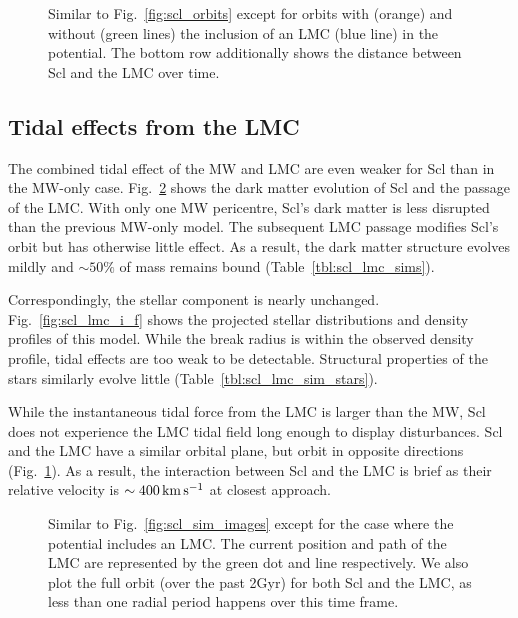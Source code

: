 \begin{figure}
\centering
{}
\caption[Sculptor orbits with LMC]{Similar to Fig.~\ref{fig:scl_orbits}
except for orbits with (orange) and without (green lines) the inclusion
of an LMC (blue line) in the potential. The bottom row additionally
shows the distance between Scl and the LMC over
time.}\label{fig:scl_lmc_orbits_effect}
\end{figure}

\subsection{Tidal effects from the
LMC}\label{tidal-effects-from-the-lmc}

The combined tidal effect of the MW and LMC are even weaker for Scl than
in the MW-only case. Fig.~\ref{fig:scl_lmc_sim_images} shows the dark
matter evolution of Scl and the passage of the LMC. With only one MW
pericentre, Scl's dark matter is less disrupted than the previous
MW-only model. The subsequent LMC passage modifies Scl's orbit but has
otherwise little effect. As a result, the dark matter structure evolves
mildly and \(\sim 50\%\) of mass remains bound
(Table~\ref{tbl:scl_lmc_sims}).

Correspondingly, the stellar component is nearly unchanged.
Fig.~\ref{fig:scl_lmc_i_f} shows the projected stellar distributions and
density profiles of this model. While the break radius is within the
observed density profile, tidal effects are too weak to be detectable.
Structural properties of the stars similarly evolve little
(Table~\ref{tbl:scl_lmc_sim_stars}).

While the instantaneous tidal force from the LMC is larger than the MW,
Scl does not experience the LMC tidal field long enough to display
disturbances. Scl and the LMC have a similar orbital plane, but orbit in
opposite directions (Fig.~\ref{fig:scl_lmc_orbits_effect}). As a result,
the interaction between Scl and the LMC is brief as their relative
velocity is \(\sim 400\,{\rm km\,s^{-1}}\) at closest approach.

\begin{figure}
\centering
{}
\caption[Sculptor simulation snapshots with LMC]{Similar to
Fig.~\ref{fig:scl_sim_images} except for the case where the potential
includes an LMC. The current position and path of the LMC are
represented by the green dot and line respectively. We also plot the
full orbit (over the past 2Gyr) for both Scl and the LMC, as less than
one radial period happens over this time
frame.}\label{fig:scl_lmc_sim_images}
\end{figure}

